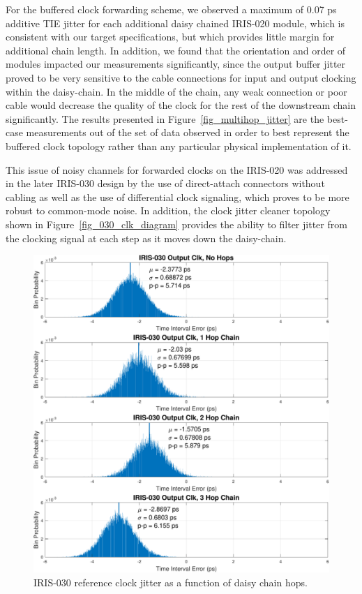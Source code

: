 	For the buffered clock forwarding scheme, we observed a maximum of 0.07 ps additive TIE jitter for each additional daisy chained IRIS-020 module, which is consistent with our target specifications, but which provides little margin for additional chain length.
	In addition, we found that the orientation and order of modules impacted our measurements significantly, since the output buffer jitter proved to be very sensitive to the cable connections for input and output clocking within the daisy-chain.
	In the middle of the chain, any weak connection or poor cable would decrease the quality of the clock for the rest of the downstream chain significantly.
	The results presented in Figure~\ref{fig_multihop_jitter} are the best-case measurements out of the set of data observed in order to best represent the buffered clock topology rather than any particular physical implementation of it.
	
	This issue of noisy channels for forwarded clocks on the IRIS-020 was addressed in the later IRIS-030 design by the use of direct-attach connectors without cabling as well as the use of differential clock signaling, which proves to be more robust to common-mode noise.
	In addition, the clock jitter cleaner topology shown in Figure~\ref{fig_030_clk_diagram} provides the ability to filter jitter from the clocking signal at each step as it moves down the daisy-chain.


\begin{figure}[p]
\centering
\includegraphics[width=1\textwidth]{figs/clk/iris030_multihop_jitter}
\caption{IRIS-030 reference clock jitter as a function of daisy chain hops.}
\label{fig_030_clk_jitter}
\end{figure}



